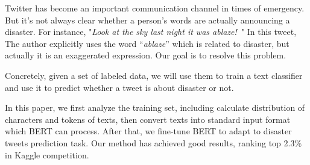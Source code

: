 \documentclass{amsart}
\begin{document}





Twitter has become an important communication channel in times of emergency. But it’s not always clear whether a person’s words are actually announcing a disaster. For instance, "\emph{Look at the sky last night it was ablaze!}\ " In this tweet, The author explicitly uses the word “\emph{ablaze}” which is related to disaster, but actually it is an exaggerated expression. Our goal is to resolve this problem. 

Concretely, given a set of labeled data, we will use them to train a text classifier and use it to predict whether a tweet is about disaster or not. 

In this paper, we first analyze the training set, including calculate distribution of characters and tokens of texts, then convert texts into standard input format which BERT can process. After that, we fine-tune BERT to adapt to disaster tweets prediction task. Our method has achieved good results, ranking top 2.3$\%$ in Kaggle competition.


\end{document}
